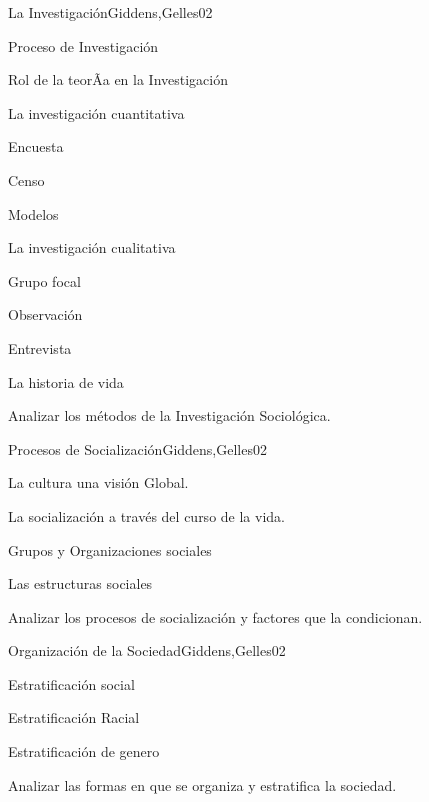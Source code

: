 \begin{syllabus}
\begin{unit}{La Investigación}{Giddens,Gelles}{0}{2}
    \begin{topics}
      \item Proceso de Investigación
      \item Rol de la teorÃ­a en la Investigación
      \item La investigación cuantitativa
      \item Encuesta
      \item Censo
      \item Modelos
      \item La investigación cualitativa
      \item Grupo focal
      \item Observación
      \item Entrevista
      \item La historia de vida
    \end{topics}
    \begin{unitgoals}
      \item Analizar los métodos de la Investigación Sociológica.
    \end{unitgoals}
\end{unit}

\begin{unit}{Procesos de Socialización}{Giddens,Gelles}{0}{2}
    \begin{topics}
      \item La cultura una visión Global.
      \item La socialización a través del curso de la vida.
      \item Grupos y Organizaciones sociales
      \item Las estructuras sociales
    \end{topics}
    \begin{unitgoals}
      \item Analizar los procesos de socialización y factores que la condicionan.
    \end{unitgoals}
\end{unit}

\begin{unit}{Organización de la Sociedad}{Giddens,Gelles}{0}{2}
    \begin{topics}
      \item Estratificación social
      \item Estratificación Racial
      \item Estratificación de genero
    \end{topics}
    \begin{unitgoals}
      \item Analizar las formas en que se organiza y estratifica la sociedad.
    \end{unitgoals}
\end{unit}


\end{syllabus}
